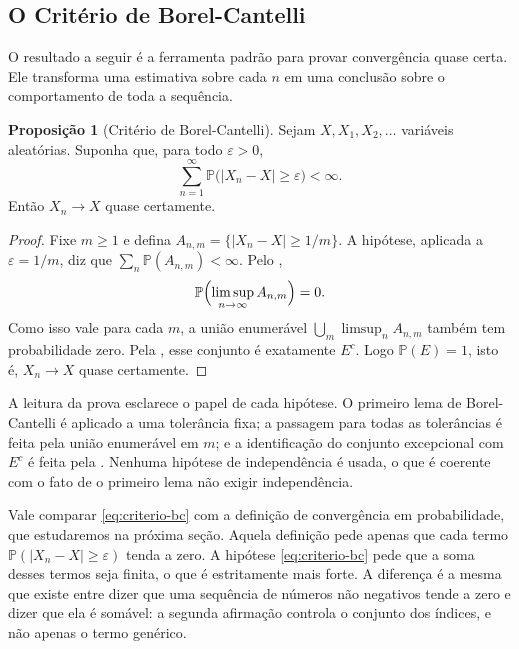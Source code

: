 \documentclass[12pt,portuguese]{article}
\theoremstyle{definition}
\newtheorem{proposition}[proposition]{Proposição}
\theoremstyle{plainexercise}
\theoremstyle{starredexercise}
\theoremstyle{definition}
\begin{document}
\subsection{O Critério de Borel-Cantelli}\label{subsec:qc-criterio}

O resultado a seguir é a ferramenta padrão para provar convergência quase certa.
Ele transforma uma estimativa sobre cada $n$ em uma conclusão sobre o
comportamento de toda a sequência.

\begin{proposition}[Critério de Borel-Cantelli]\label{prop:criterio-bc}
Sejam $X,X_1,X_2,\ldots$ variáveis aleatórias. Suponha que, para todo
$\varepsilon>0$,
\begin{equation}\label{eq:criterio-bc}
\sum_{n=1}^{\infty}\mathbb{P}\bigl(|X_n-X|\geqslant\varepsilon\bigr)<\infty.
\end{equation}
Então $X_n\to X$ quase certamente.
\end{proposition}

\begin{proof}
Fixe $m\geqslant1$ e defina $A_{n,m}=\{|X_n-X|\geqslant1/m\}$. A hipótese,
aplicada a $\varepsilon=1/m$, diz que $\sum_n\mathbb{P}(A_{n,m})<\infty$. Pelo
,
\[
\mathbb{P}\Bigl(\limsup_{n\to\infty}A_{n,m}\Bigr)=0.
\]
Como isso vale para cada $m$, a união enumerável
$\bigcup_m\limsup_n A_{n,m}$ também tem probabilidade zero. Pela
, esse conjunto é exatamente $E^c$. Logo
$\mathbb{P}(E)=1$, isto é, $X_n\to X$ quase certamente.
\end{proof}

A leitura da prova esclarece o papel de cada hipótese. O primeiro lema de
Borel-Cantelli é aplicado a uma tolerância fixa; a passagem para todas as
tolerâncias é feita pela união enumerável em $m$; e a identificação do conjunto
excepcional com $E^c$ é feita pela . Nenhuma
hipótese de independência é usada, o que é coerente com o fato de o primeiro
lema não exigir independência.

Vale comparar \eqref{eq:criterio-bc} com a definição de convergência em
probabilidade, que estudaremos na próxima seção. Aquela definição pede apenas
que cada termo $\mathbb{P}(|X_n-X|\geqslant\varepsilon)$ tenda a zero. A
hipótese \eqref{eq:criterio-bc} pede que a soma desses termos seja finita, o
que é estritamente mais forte. A diferença é a mesma que existe entre dizer que
uma sequência de números não negativos tende a zero e dizer que ela é somável:
a segunda afirmação controla o conjunto dos índices, e não apenas o termo
genérico.
\end{document}
